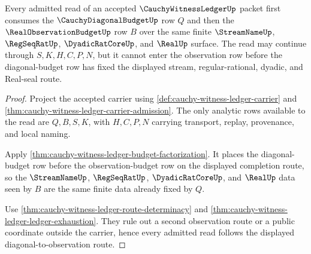 \begin{theorem}
\label{thm:cauchy-witness-ledger-diagonal-observation-route}
Every admitted read of an accepted $\CauchyWitnessLedgerUp$ packet first consumes the $\CauchyDiagonalBudgetUp$ row $Q$ and then the $\RealObservationBudgetUp$ row $B$ over the same finite $\StreamNameUp$, $\RegSeqRatUp$, $\DyadicRatCoreUp$, and $\RealUp$ surface. The read may continue through $S,K,H,C,P,N$, but it cannot enter the observation row before the diagonal-budget row has fixed the displayed stream, regular-rational, dyadic, and Real-seal route.
\end{theorem}
\begin{proof}
Project the accepted carrier using \autoref{def:cauchy-witness-ledger-carrier} and \autoref{thm:cauchy-witness-ledger-carrier-admission}. The only analytic rows available to the read are $Q,B,S,K$, with $H,C,P,N$ carrying transport, replay, provenance, and local naming.

Apply \autoref{thm:cauchy-witness-ledger-budget-factorization}. It places the diagonal-budget row before the observation-budget row on the displayed completion route, so the $\StreamNameUp$, $\RegSeqRatUp$, $\DyadicRatCoreUp$, and $\RealUp$ data seen by $B$ are the same finite data already fixed by $Q$.

Use \autoref{thm:cauchy-witness-ledger-route-determinacy} and \autoref{thm:cauchy-witness-ledger-ledger-exhaustion}. They rule out a second observation route or a public coordinate outside the carrier, hence every admitted read follows the displayed diagonal-to-observation route.
\end{proof}


